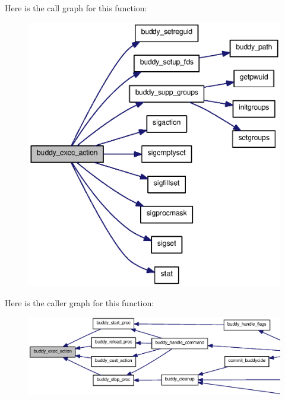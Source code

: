 Here is the call graph for this function:
\nopagebreak
\begin{figure}[H]
\begin{center}
\leavevmode
\includegraphics[width=386pt]{buddy_8c_a3e61e516f17cf6184731f66b065a0b69_cgraph}
\end{center}
\end{figure}




Here is the caller graph for this function:\nopagebreak
\begin{figure}[H]
\begin{center}
\leavevmode
\includegraphics[width=400pt]{buddy_8c_a3e61e516f17cf6184731f66b065a0b69_icgraph}
\end{center}
\end{figure}


